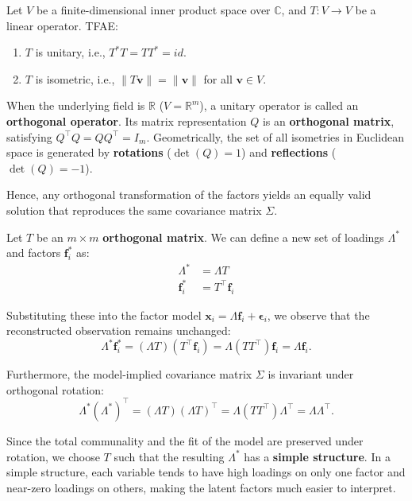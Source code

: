 \documentclass[12pt]{article}
\begin{document}
\begin{thmbox}
    Let $V$ be a finite-dimensional inner product space over $\mathbb{C}$, and
    $T:V\to V$ be a linear operator. TFAE:
    \begin{enumerate}
        \item $T$ is unitary, i.e., $T^*T=TT^*=id$.
        \item $T$ is isometric, i.e., $\|T\mathbf{v}\| = \|\mathbf{v}\|$ for all $\mathbf{v} \in V$. 
    \end{enumerate}
\end{thmbox}

\begin{remark}
    When the underlying field is $\mathbb{R}$ ($V = \mathbb{R}^m$), a unitary operator is called an \textbf{orthogonal operator}. Its matrix representation $Q$ is an \textbf{orthogonal matrix}, satisfying $Q^\top Q = Q Q^\top = I_m$. 
    Geometrically, the set of all isometries in Euclidean space is generated by \textbf{rotations} ($\det(Q) = 1$) and \textbf{reflections} ($\det(Q) = -1$).
\end{remark}

Hence, any orthogonal transformation of the factors yields an equally valid solution that reproduces the same covariance matrix $\Sigma$.

Let $T$ be an $m \times m$ \textbf{orthogonal matrix}. We can define a new set of loadings $\Lambda^*$ and factors $\mathbf{f}^*_i$ as:
\begin{align*}
\Lambda^* &= \Lambda T \\
\mathbf{f}^*_i &= T^\top \mathbf{f}_i
\end{align*}

Substituting these into the factor model $\mathbf{x}_i = \Lambda \mathbf{f}_i + \boldsymbol{\epsilon}_i$, we observe that the reconstructed observation remains unchanged:
\[
\Lambda^* \mathbf{f}^*_i = (\Lambda T)(T^\top \mathbf{f}_i) = \Lambda (T T^\top) \mathbf{f}_i = \Lambda \mathbf{f}_i.
\]

Furthermore, the model-implied covariance matrix $\Sigma$ is invariant under orthogonal rotation:
\[
\Lambda^* (\Lambda^*)^\top = (\Lambda T)(\Lambda T)^\top = \Lambda (T T^\top) \Lambda^\top = \Lambda \Lambda^\top.
\]

\begin{remark}
Since the total communality and the fit of the model are preserved under rotation, we choose $T$ such that the resulting $\Lambda^*$ has a \textbf{simple structure}. In a simple structure, each variable tends to have high loadings on only one factor and near-zero loadings on others, making the latent factors much easier to interpret.
\end{remark}

\nocite{tsoi_linalg, lin_dimensionality}



\end{document}
